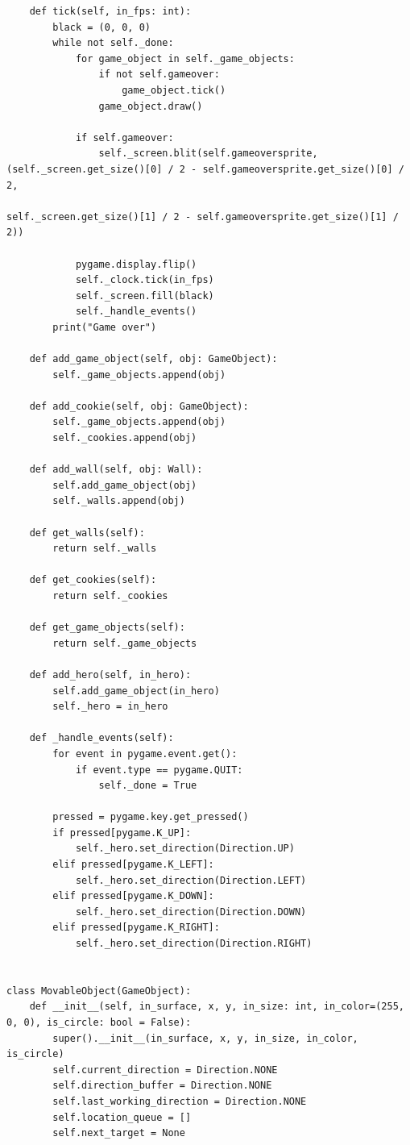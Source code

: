 \documentclass[a4paper,14pt]{extarticle}
\begin{document}
\begin{verbatim}
    def tick(self, in_fps: int):
        black = (0, 0, 0)
        while not self._done:
            for game_object in self._game_objects:
                if not self.gameover:
                    game_object.tick()
                game_object.draw()

            if self.gameover:
                self._screen.blit(self.gameoversprite, (self._screen.get_size()[0] / 2 - self.gameoversprite.get_size()[0] / 2,
                                                        self._screen.get_size()[1] / 2 - self.gameoversprite.get_size()[1] / 2))

            pygame.display.flip()
            self._clock.tick(in_fps)
            self._screen.fill(black)
            self._handle_events()
        print("Game over")

    def add_game_object(self, obj: GameObject):
        self._game_objects.append(obj)

    def add_cookie(self, obj: GameObject):
        self._game_objects.append(obj)
        self._cookies.append(obj)

    def add_wall(self, obj: Wall):
        self.add_game_object(obj)
        self._walls.append(obj)

    def get_walls(self):
        return self._walls

    def get_cookies(self):
        return self._cookies

    def get_game_objects(self):
        return self._game_objects

    def add_hero(self, in_hero):
        self.add_game_object(in_hero)
        self._hero = in_hero

    def _handle_events(self):
        for event in pygame.event.get():
            if event.type == pygame.QUIT:
                self._done = True

        pressed = pygame.key.get_pressed()
        if pressed[pygame.K_UP]:
            self._hero.set_direction(Direction.UP)
        elif pressed[pygame.K_LEFT]:
            self._hero.set_direction(Direction.LEFT)
        elif pressed[pygame.K_DOWN]:
            self._hero.set_direction(Direction.DOWN)
        elif pressed[pygame.K_RIGHT]:
            self._hero.set_direction(Direction.RIGHT)


class MovableObject(GameObject):
    def __init__(self, in_surface, x, y, in_size: int, in_color=(255, 0, 0), is_circle: bool = False):
        super().__init__(in_surface, x, y, in_size, in_color, is_circle)
        self.current_direction = Direction.NONE
        self.direction_buffer = Direction.NONE
        self.last_working_direction = Direction.NONE
        self.location_queue = []
        self.next_target = None


\end{verbatim}
\end{document}

